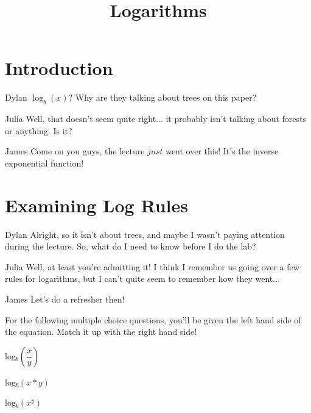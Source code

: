 \documentclass{ximera}
\title{Logarithms}
\begin{document}
\maketitle
\section{Introduction}
\begin{dialogue}
\item[Dylan] $\log_b(x)$? Why are they talking about trees on this paper?
\item[Julia] Well, that doesn't seem quite right... it probably isn't talking about forests or anything. Is it?
\item[James] Come on you guys, the lecture $just$ went over this! It's the inverse exponential function!
\end{dialogue}

\section{Examining Log Rules}
\begin{dialogue}
\item[Dylan] Alright, so it isn't about trees, and maybe I wasn't paying attention during the lecture. So, what do I need to know before I do the lab?
\item[Julia] Well, at least you're admitting it! I think I remember us going over a few rules for logarithms, but I can't quite seem to remember how they went...
\item[James] Let's do a refresher then!
\end{dialogue}
For the following multiple choice questions, you'll be given the left hand side of the equation. Match it up with the right hand side!
\begin{question}
log$_b\left(\dfrac{x}{y}\right)$

\begin{multipleChoice}
\end{multipleChoice}

log$_b(x*y)$
\begin{multipleChoice}
\end{multipleChoice}

log$_b(x^y)$
\begin{multipleChoice}
\end{multipleChoice}
\end{question}
\end{document}
